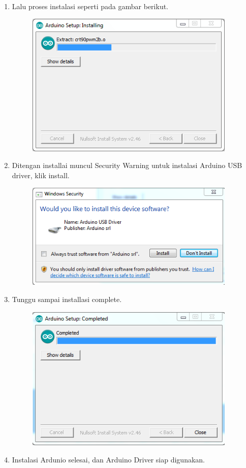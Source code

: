\begin{enumerate}
\begin{figure}[H]
		\centering
	\end{figure}
    \item Lalu proses instalasi seperti pada gambar berikut.
    \begin{figure}[H]
		\includegraphics[width=10cm]{figures/5/1174071/Teori/4.png}
		\centering
	\end{figure}
    \item Ditengan installai muncul Security Warning untuk instalasi Arduino USB driver, klik install.
    \begin{figure}[H]
		\includegraphics[width=10cm]{figures/5/1174071/Teori/5.png}
		\centering
	\end{figure}
    \item Tunggu sampai installasi complete.
    \begin{figure}[H]
		\includegraphics[width=10cm]{figures/5/1174071/Teori/6.png}
		\centering
	\end{figure}
    \item Instalasi Ardunio selesai, dan Arduino Driver siap digunakan.

\end{enumerate}

